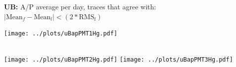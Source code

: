 \documentclass[aspectratio=169]{beamer}
\begin{document}
\begin{frame}
	{\bf UB:} A/P average per day, traces that agree with: $\mid \mathrm{Mean}_f - \mathrm{Mean}_l \mid < \left( 2*\mathrm{RMS_f} \right) $

  \centering
	\texttt{[image: ../plots/uBapPMT1Hg.pdf]}%
	\begin{minipage}[b][0.2\textheight][c]
		{.15\linewidth}
	\end{minipage}\\[1em]
	\texttt{[image: ../plots/uBapPMT2Hg.pdf]}\quad%
	\texttt{[image: ../plots/uBapPMT3Hg.pdf]}
\end{frame}
\end{document}
